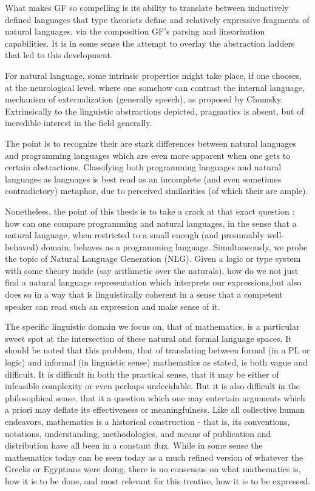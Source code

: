 What makes GF so compelling is its ability to translate between
inductively defined languages that type theorists define and relatively
expressive fragments of natural languages, via the composition GF's parsing and
linearization capabilities. It is in some sense the attempt to overlay the
abstraction ladders that led to this development. 

For natural language, some intrinsic properties might take place, if one
chooses, at the neurological level, where one somehow can contrast the internal
language, mechanism of externalization (generally speech), as proposed by
Chomsky. Extrinsically to the linguistic abstractions depicted, pragmatics is
absent, but of incredible interest in the field generally.

The point is to recognize their are stark differences between natural languages
and programming languages which are even more apparent when one gets to certain
abstractions. Classifying both programming languages and natural languages as
languages is best read as an incomplete (and even sometimes contradictory)
metaphor, due to perceived similarities (of which their are ample).

Nonetheless, the point of this thesis is to take a crack at that exact question
: how can one compare programming and natural languages, in the sense that a
natural language, when restricted to a small enough (and presumably
well-behaved) domain, behaves as a programming language. Simultaneously, we
probe the topic of Natural Language Generation (NLG). Given a
logic or type system with some theory inside (say arithmetic over the naturals),
how do we not just find a natural language representation which interprets our
expressions,but also does so in a way that is linguistically coherent in a
sense that a competent speaker can read such an expression and make sense of it.

The specific linguistic domain we focus on, that of mathematics, is a particular
sweet spot at the intersection of these natural and formal language spaces. It should be
noted that this problem, that of translating between formal (in a PL or logic)
and informal (in linguistic sense) mathematics as stated, is both vague and
difficult. It is difficult in both the practical sense, that it may be
either of infeasible complexity or even perhaps undecidable. But it is also
difficult in the philosophical sense, that it a question which one may entertain
arguments which a priori may deflate its effectiveness or meaningfulness.
Like all collective human endeavors, mathematics is a historical
construction - that is, its conventions, notations, understanding,
methodologies, and means of publication and distribution have all been in a
constant flux. While in some sense the mathematics today can be seen today as a
much refined version of whatever the Greeks or Egyptians were doing, there is no
consensus on what mathematics is, how it is to be done, and most relevant for
this treatise, how it is to be expressed.


